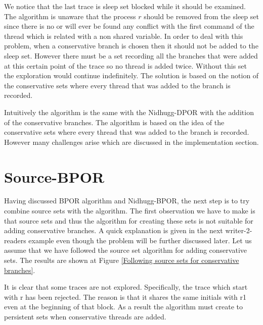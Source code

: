 
We notice that the last trace is sleep set blocked while it should be examined. The algorithm is unaware that the
process $r$ should be removed from the sleep set since there is no or will ever be found any conflict with the first
command of the thread which is related with a non shared variable. In order to deal with this problem, when a
conservative branch is chosen then it should not be added to the sleep set. However there must be a set recording all
the branches that were added at this certain point of the trace so no thread is added twice. Without this set the
exploration would continue indefinitely. The solution is based on the notion of the conservative sets where every thread
that was added to the branch is recorded. 

Intuitively the algorithm is the same with the Nidhugg-DPOR with the addition of the conservative branches. 
The algorithm is based on the idea of the conservative sets where every thread that was added to the branch is recorded.  
However many challenges arise which are discussed in the implementation section.


\section{Source-BPOR}

Having discussed BPOR algorithm and Nidhugg-BPOR, the next step is to try combine source sets with the algorithm. The
first observation we have to make is that source sets and thus the algorithm for creating these sets is not suitable for
adding conservative branches. A quick explanation is given in the next writer-2-readers example even though the problem
will be further discussed later. Let us assume that we have followed the source set algorithm for adding conservative
sets. The results are shown at Figure \ref{Following source sets for conservative branches}.


It is clear that some traces are not explored. Specifically, the trace which start with r has been rejected. The reason
is that it shares the same initials with r1 even at the beginning of that block. As a result the algorithm must create
to persistent sets when conservative threads are added. 

